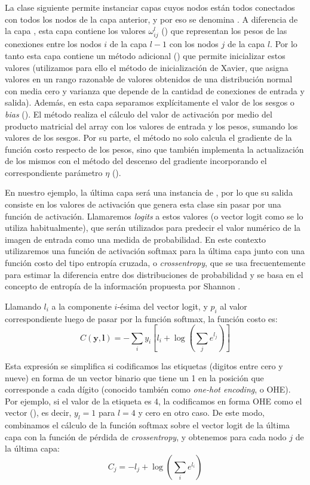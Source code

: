 La clase siguiente permite instanciar capas cuyos nodos están todos conectados con todos los nodos de la capa anterior, y por eso se denomina . A diferencia de la capa , esta capa contiene los valores $\omega_{ij}^l$ () que representan los pesos de las conexiones entre los nodos $i$ de la capa $l-1$ con los nodos $j$ de la capa $l$. Por lo tanto esta capa contiene un método adicional () que permite inicializar estos valores (utilizamos para ello el método de inicialización de Xavier\cite{glorot2010}, que asigna valores en un rango razonable de valores obtenidos de una distribución normal con media cero y varianza que depende de la cantidad de conexiones de entrada y salida). Además, en esta capa separamos explícitamente el valor de los sesgos o \textit{bias} (). El método  realiza el cálculo del valor de activación por medio del producto matricial del array con los valores de entrada y los pesos, sumando los valores de los sesgos. Por su parte, el método  no solo calcula el gradiente de la función costo respecto de los pesos, sino que también implementa la actualización de los mismos  con el método del descenso del gradiente incorporando el correspondiente parámetro $\eta$ ().


En nuestro ejemplo, la última capa será una instancia de , por lo que su salida consiste en los valores de activación que genera esta clase sin pasar por una función de activación. Llamaremos \textit{logits} a estos valores (o vector logit como se lo utiliza habitualmente), que serán utilizados para predecir el valor numérico de la imagen de entrada como una medida de probabilidad. En este contexto utilizaremos una función de activación softmax para la última capa junto con una función costo del tipo entropía cruzada, o \textit{crossentropy}, que se usa frecuentemente para estimar la diferencia entre dos distribuciones de probabilidad y se basa en el concepto de entropía de la información propuesta por Shannon \cite{shannon1948}.

Llamando $l_i$ a la componente $i$-ésima del vector logit, y $p_i$ al valor correspondiente luego de pasar por la función softmax, la función costo es:
\[ C(\bm{y}, \bm{l}) = -\sum_i {y_i \left[l_i + \log\left(\sum_j e^{l_j}\right)\right]} \]

Esta expresión se simplifica si codificamos las etiquetas (digitos entre cero y nueve) en forma de un vector binario que tiene un 1 en la posición que corresponde a cada dígito (conocido también como \textit{one-hot encoding}, o OHE). Por ejemplo, si el valor de la etiqueta es 4, la codificamos en forma OHE como el vector (), es decir, $y_l = 1$ para $l = 4$ y cero en otro caso. De este modo, combinamos el cálculo de la función softmax sobre el vector logit de la última capa con la función de pérdida de \textit{crossentropy}, y obtenemos para cada nodo $j$ de la última capa:
\[ C_j = -l_j + \log \left(\sum_i e^{l_i}\right) \]

